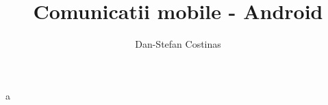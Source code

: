 \documentclass[12pt,a4paper,twoside]{article}
\title{Comunicatii mobile - Android}
\author{Dan-Stefan Costinas}
\begin{document}
    \maketitle
a
\end{document}
